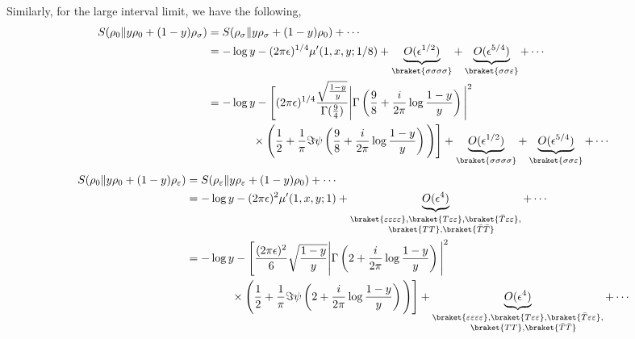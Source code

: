 \documentclass[11pt]{article}
\newcommand{\ep}{\epsilon}
\newcommand{\nn}{\nonumber}
\newcommand{\lb}{\left(}
\newcommand{\rb}{\right)}
\begin{document}
Similarly, for the large interval limit, we have the following,
\begin{align}
    S(\rho_0 \| y \rho_0 + (1-y)\rho_\sigma) &=S(\rho_\sigma \| y \rho_\sigma + (1-y)\rho_0) +\cdots \\
    &=-\log y - (2\pi \ep)^{1/4} \mu'(1,x,y;1/8)+ \underbrace{O(\ep^{1/2})}_{\braket{\sigma\sigma\sigma\sigma}}+ \underbrace{O(\ep^{5/4})}_{\braket{\sigma\sigma\varepsilon}}+\cdots \\
    &= -\log y  -\Bigg[ (2\pi \ep)^{1/4}\frac{\sqrt\frac{1-y}{y}}{\Gamma(\frac{9}{4})}\Bigg| \Gamma\lb \frac{9}{8} + \frac{i}{2\pi}\log \frac{1-y}{y}\rb \Bigg|^2 \nn\\
    &\qquad\qquad\times\Bigg( \frac{1}{2} + \frac{1}{\pi}\Im \psi \lb \frac{9}{8}+ \frac{i}{2\pi}\log \frac{1-y}{y}\rb\Bigg)\Bigg]+ \underbrace{O(\ep^{1/2})}_{\braket{\sigma\sigma\sigma\sigma}}+ \underbrace{O(\ep^{5/4})}_{\braket{\sigma\sigma\varepsilon}}+\cdots 
\end{align}
\begin{align}
    S(\rho_0 \| y \rho_0 + (1-y)\rho_\varepsilon) &=S(\rho_\varepsilon \| y \rho_\varepsilon + (1-y)\rho_0) +\cdots \\&= -\log y - (2\pi \ep)^{2} \mu'(1,x,y;1)+ \underbrace{O(\ep^{4})}_{\substack{\braket{\varepsilon\varepsilon\varepsilon\varepsilon} ,\braket{T\varepsilon\varepsilon}, \braket{\bar T \varepsilon\varepsilon},\\\quad \braket{TT},\braket{\bar T \bar T}}}+\cdots\\
    &=  -\log y  - \Bigg[\frac{(2\pi \ep)^{2}}{6}\sqrt \frac{1-y}{y}\Bigg| \Gamma\lb 2 + \frac{i}{2\pi}\log \frac{1-y}{y}\rb \Bigg|^2 \nn\\
    &\qquad\qquad \times\Bigg( \frac{1}{2} + \frac{1}{\pi}\Im \psi \lb 2+ \frac{i}{2\pi}\log \frac{1-y}{y}\rb\Bigg)\Bigg]+ \underbrace{O(\ep^{4})}_{\substack{\braket{\varepsilon\varepsilon\varepsilon\varepsilon} ,\braket{T\varepsilon\varepsilon}, \braket{\bar T \varepsilon\varepsilon},\\\quad \braket{TT},\braket{\bar T \bar T}}}+\cdots 
\end{align}
\end{document}
